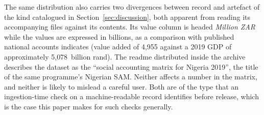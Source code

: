 The same distribution also carries two divergences between record and
artefact of the kind catalogued in Section~\ref{sec:discussion}, both
apparent from reading its accompanying files against its contents. Its
value column is headed \emph{Million ZAR} while the values are expressed
in billions, as a comparison with published national accounts indicates
(value added of 4{,}955 against a 2019 GDP of approximately
5{,}078~billion rand). The readme distributed inside the archive
describes the dataset as the ``social accounting matrix for Nigeria
2019'', the title of the same programme's Nigerian SAM. Neither affects a
number in the matrix, and neither is likely to mislead a careful user.
Both are of the type that an ingestion-time check on a machine-readable
record identifies before release, which is the case this paper makes for
such checks generally.
